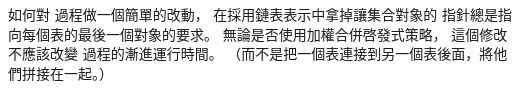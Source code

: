 \startEXERCISE
如何對  過程做一個簡單的改動，
在採用鏈表表示中拿掉讓集合對象的  指針總是指向每個表的最後一個對象的要求。
無論是否使用加權合併啓發式策略，
這個修改不應該改變  過程的漸進運行時間。
（\hint 而不是把一個表連接到另一個表後面，將他們拼接在一起。）
\stopEXERCISE

\startANSWER
{}
\stopANSWER